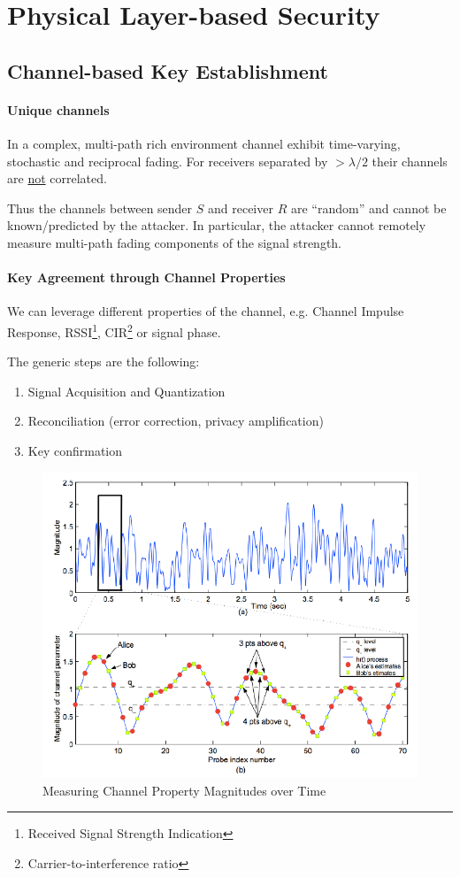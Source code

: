 \section{Physical Layer-based Security}


\subsection{Channel-based Key Establishment}

\paragraph{Unique channels}
In a complex, multi-path rich environment channel exhibit time-varying, stochastic and reciprocal fading.
For receivers separated by $> \lambda / 2$ their channels are \underline{not} correlated.

Thus the channels between sender $S$ and receiver $R$ are ``random'' and cannot be known/predicted by the attacker.
In particular, the attacker cannot remotely measure multi-path fading components of the signal strength.

\paragraph{Key Agreement through Channel Properties}
We can leverage different properties of the channel, e.g. Channel Impulse Response, RSSI\footnote{Received Signal Strength Indication}, CIR\footnote{Carrier-to-interference ratio} or signal phase.

The generic steps are the following:
\begin{enumerate}
	\item Signal Acquisition and Quantization
	\item Reconciliation (error correction, privacy amplification)
	\item Key confirmation
\end{enumerate}

\begin{figure}[h]
	\centering
	\includegraphics[scale=0.5]{images/7-channel-property.png}
	\caption{Measuring Channel Property Magnitudes over Time}%
	\label{fig:channel-property}
\end{figure}

